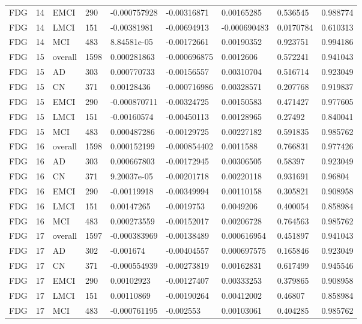 \begin{landscape}
\begin{longtable}{lllllllll}
FDG & 14 & EMCI & 290 & -0.000757928 & -0.00316871 & 0.00165285 & 0.536545 & 0.988774 \\
FDG & 14 & LMCI & 151 & -0.00381981 & -0.00694913 & -0.000690483 & 0.0170784 & 0.610313 \\
FDG & 14 & MCI & 483 & 8.84581e-05 & -0.00172661 & 0.00190352 & 0.923751 & 0.994186 \\
FDG & 15 & overall & 1598 & 0.000281863 & -0.000696875 & 0.0012606 & 0.572241 & 0.941043 \\
FDG & 15 & AD & 303 & 0.000770733 & -0.00156557 & 0.00310704 & 0.516714 & 0.923049 \\
FDG & 15 & CN & 371 & 0.00128436 & -0.000716986 & 0.00328571 & 0.207768 & 0.919837 \\
FDG & 15 & EMCI & 290 & -0.000870711 & -0.00324725 & 0.00150583 & 0.471427 & 0.977605 \\
FDG & 15 & LMCI & 151 & -0.00160574 & -0.00450113 & 0.00128965 & 0.27492 & 0.840041 \\
FDG & 15 & MCI & 483 & 0.000487286 & -0.00129725 & 0.00227182 & 0.591835 & 0.985762 \\
FDG & 16 & overall & 1598 & 0.000152199 & -0.000854402 & 0.0011588 & 0.766831 & 0.977426 \\
FDG & 16 & AD & 303 & 0.000667803 & -0.00172945 & 0.00306505 & 0.58397 & 0.923049 \\
FDG & 16 & CN & 371 & 9.20037e-05 & -0.00201718 & 0.00220118 & 0.931691 & 0.96804 \\
FDG & 16 & EMCI & 290 & -0.00119918 & -0.00349994 & 0.00110158 & 0.305821 & 0.908958 \\
FDG & 16 & LMCI & 151 & 0.00147265 & -0.0019753 & 0.0049206 & 0.400054 & 0.858984 \\
FDG & 16 & MCI & 483 & 0.000273559 & -0.00152017 & 0.00206728 & 0.764563 & 0.985762 \\
FDG & 17 & overall & 1597 & -0.000383969 & -0.00138489 & 0.000616954 & 0.451897 & 0.941043 \\
FDG & 17 & AD & 302 & -0.001674 & -0.00404557 & 0.000697575 & 0.165846 & 0.923049 \\
FDG & 17 & CN & 371 & -0.000554939 & -0.00273819 & 0.00162831 & 0.617499 & 0.945546 \\
FDG & 17 & EMCI & 290 & 0.00102923 & -0.00127407 & 0.00333253 & 0.379865 & 0.908958 \\
FDG & 17 & LMCI & 151 & 0.00110869 & -0.00190264 & 0.00412002 & 0.46807 & 0.858984 \\
FDG & 17 & MCI & 483 & -0.000761195 & -0.002553 & 0.00103061 & 0.404285 & 0.985762 \\

\end{longtable}
\end{landscape}
